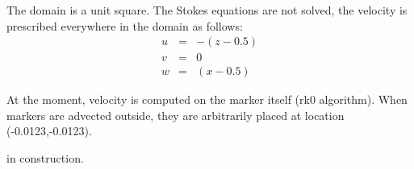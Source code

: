 
The domain is a unit square. The Stokes equations are not solved, the velocity is prescribed everywhere 
in the domain as follows:
\begin{eqnarray}
u&=&-(z-0.5)\\
v&=&0\\
w&=&(x-0.5)
\end{eqnarray}

At the moment, velocity is computed on the marker itself (rk0 algorithm).
When markers are advected outside, they are arbitrarily placed at location (-0.0123,-0.0123).

in construction. 
